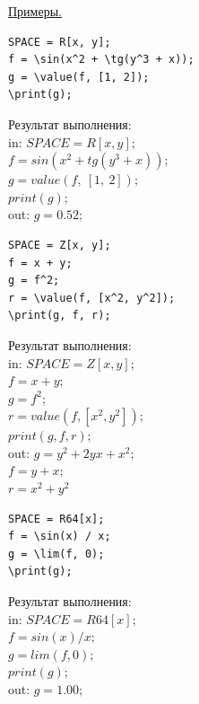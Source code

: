 \smallskip

\underline{Примеры. }

\vspace*{-2mm}
\begin{verbatim}
SPACE = R[x, y];
f = \sin(x^2 + \tg(y^3 + x));
g = \value(f, [1, 2]);
\print(g);
\end{verbatim}

\vspace*{-2mm}
Результат выполнения:\\
in: $SPACE=R[x, y];$\\ 
\hspace*{4mm} $f=sin(x^2+tg(y^3+x)); $\\
\hspace*{4mm} $g=value(f,\ [1,\ 2]); $\\
\hspace*{4mm} $print(g);$\\
out: $g = 0. 52;$\\
\vspace*{-2mm}

\begin{verbatim}
SPACE = Z[x, y];
f = x + y;
g = f^2;
r = \value(f, [x^2, y^2]);
\print(g, f, r);
\end{verbatim}

\vspace*{-2mm}
Результат выполнения: \\
in: $SPACE=Z[x, y]; $\\
\hspace*{4mm} $f=x+y;$\\ 
\hspace*{4mm} $g=f^2; $\\
\hspace*{4mm} $r=value(f, [x^2, y^2]); $\\
\hspace*{4mm} $print(g, f, r);$\\
out: $g = y^{2}+2yx+x^{2}; $ \\
\hspace*{4mm} $f = y+x;$ \\ 
\hspace*{4mm} $r=x^2+y^2 $
\vspace*{-3mm}

\begin{verbatim}
SPACE = R64[x];
f = \sin(x) / x;
g = \lim(f, 0);
\print(g);
\end{verbatim}

\vspace*{-3mm}
Результат выполнения: \\
in: $ SPACE=R64[x]; $\\
\hspace*{4mm} $f=sin(x)/x; $\\
\hspace*{4mm} $g=lim(f, 0); $\\
\hspace*{4mm} $print(g);$\\
out: $g = 1. 00;$
\vspace*{-3mm}

